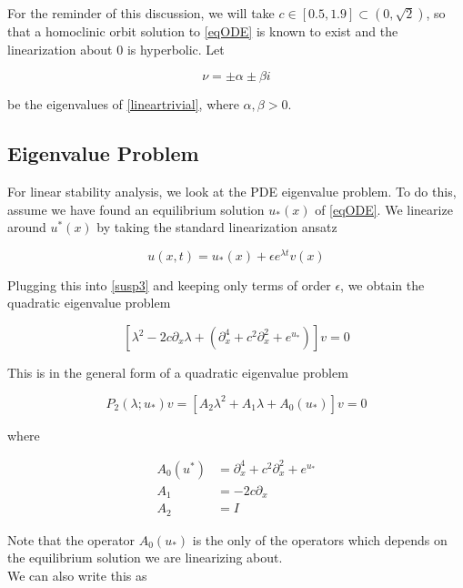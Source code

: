 \documentclass[12pt]{article}
\begin{document}
For the reminder of this discussion, we will take $c \in [0.5, 1.9] \subset (0, \sqrt{2})$, so that a homoclinic orbit solution to \eqref{eqODE} is known to exist and the linearization about 0 is hyperbolic. Let 

\begin{equation}
\nu = \pm \alpha \pm \beta i
\end{equation}

be the eigenvalues of \eqref{lineartrivial}, where $\alpha, \beta > 0$.

\subsection{Eigenvalue Problem}

For linear stability analysis, we look at the PDE eigenvalue problem. To do this, assume we have found an equilibrium solution $u_*(x)$ of \eqref{eqODE}. We linearize around $u^*(x)$ by taking the standard linearization ansatz

\begin{equation}
u(x,t) = u_*(x) + \epsilon e^{\lambda t} v(x)
\end{equation}

Plugging this into \eqref{susp3} and keeping only terms of order $\epsilon$, we obtain the quadratic eigenvalue problem

\begin{equation}\label{evp}
[\lambda^2 - 2 c \partial_x \lambda + (\partial_x^4 + c^2 \partial_x^2 + e^{u_*})]v = 0
\end{equation}

This is in the general form of a quadratic eigenvalue problem 

\begin{equation}\label{quadeig}
P_2(\lambda; u_*)v =  [A_2 \lambda^2 + A_1 \lambda + A_0(u_*)]v = 0
\end{equation}

where

\begin{align}
A_0(u^*) &= \partial_x^4 + c^2 \partial_x^2 + e^{u_*} \\
A_1 &= -2 c \partial_x \\
A_2 &= I
\end{align}

Note that the operator $A_0(u_*)$ is the only of the operators which depends on the equilibrium solution we are linearizing about.\\

We can also write this as
\end{document}
